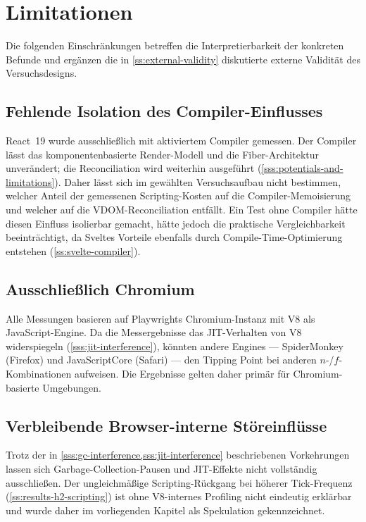 \section{Limitationen}
\label{s:limitations}

Die folgenden Einschränkungen betreffen die Interpretierbarkeit der konkreten Befunde und ergänzen die in \cref{ss:external-validity} diskutierte externe Validität des Versuchsdesigns.

\subsection{Fehlende Isolation des Compiler-Einflusses}
React~19 wurde ausschließlich mit aktiviertem Compiler gemessen. Der Compiler lässt das komponentenbasierte Render-Modell und die Fiber-Architektur unverändert; die Reconciliation wird weiterhin ausgeführt (\cref{sss:potentials-and-limitations}). Daher lässt sich im gewählten Versuchsaufbau nicht bestimmen, welcher Anteil der gemessenen Scripting-Kosten auf die Compiler-Memoisierung und welcher auf die VDOM-Reconciliation entfällt. Ein Test ohne Compiler hätte diesen Einfluss isolierbar gemacht, hätte jedoch die praktische Vergleichbarkeit beeinträchtigt, da Sveltes Vorteile ebenfalls durch Compile-Time-Optimierung entstehen (\cref{ss:svelte-compiler}).

\subsection{Ausschließlich Chromium}
Alle Messungen basieren auf Playwrights Chromium-Instanz mit V8 als JavaScript-Engine. Da die Messergebnisse das JIT-Verhalten von V8 widerspiegeln (\cref{sss:jit-interference}), könnten andere Engines — SpiderMonkey (Firefox) und JavaScriptCore (Safari) — den Tipping Point bei anderen $n$-/$f$-Kombinationen aufweisen. Die Ergebnisse gelten daher primär für Chromium-basierte Umgebungen.

\subsection{Verbleibende Browser-interne Störeinflüsse}
Trotz der in \cref{sss:gc-interference,sss:jit-interference} beschriebenen Vorkehrungen lassen sich Garbage-Collection-Pausen und JIT-Effekte nicht vollständig ausschließen. Der ungleichmäßige Scripting-Rückgang bei höherer Tick-Frequenz (\cref{ss:results-h2-scripting}) ist ohne V8-internes Profiling nicht eindeutig erklärbar und wurde daher im vorliegenden Kapitel als Spekulation gekennzeichnet.

